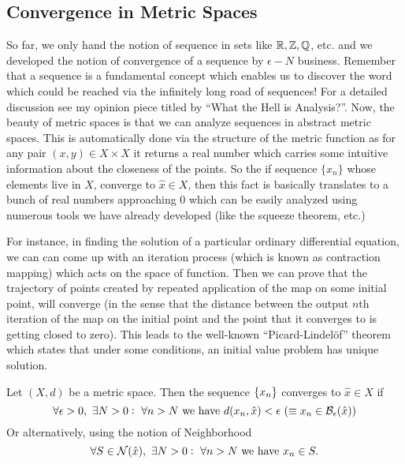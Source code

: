 \subsection{Convergence in Metric Spaces}
So far, we only hand the notion of sequence in sets like $\mathbb{R},\mathbb{Z},\mathbb{Q}$, etc. and we developed the notion of convergence of a sequence by $\epsilon-N$ business. Remember that a sequence is a fundamental concept which enables us to discover the word which could be reached via the infinitely long road of sequences! For a detailed discussion see my opinion piece titled by ``What the Hell is Analysis?''. Now, the beauty of metric spaces is that we can analyze sequences in abstract metric spaces. This is automatically done via the structure of the metric function as for any pair $(x,y)\in X\times X$ it returns a real number which carries some intuitive information about the closeness of the points. So the if sequence $\{x_n\}$ whose elements live in $X$, converge to $\hat{x}\in X$, then this fact is basically translates to a bunch of real numbers approaching $0$ which can be easily analyzed using numerous tools we have already developed (like the squeeze theorem, etc.)

For instance, in finding the solution of a particular ordinary differential equation, we can can come up with an iteration process (which is known as contraction mapping) which acts on the space of function. Then we can prove that the trajectory of points created by repeated application of the map on some initial point, will converge (in the sense that the distance between the output $n$th iteration of the map on the initial point and the point that it converges to is getting closed to zero). This leads to the well-known ``Picard-Lindelöf'' theorem which states that under some conditions, an initial value problem has unique solution.

\begin{definition}
	Let $(X,d)$ be a metric space. Then the sequence $\{x_n\}$ converges to $\hat{x}\in X$ if
	\[ \forall \epsilon>0,\ \exists N>0:\ \forall n>N \wh d(x_n,\hat{x})<\epsilon\ (\equiv  x_n \in \ball{\epsilon}{\hat{x}}) \]
	Or alternatively, using the notion of Neighborhood
	\[ \forall S \in \mathcal{N}(\hat{x}),\ \exists N>0:\ \forall n>N \ \text{we have}\  x_n \in S.  \]
\end{definition}

